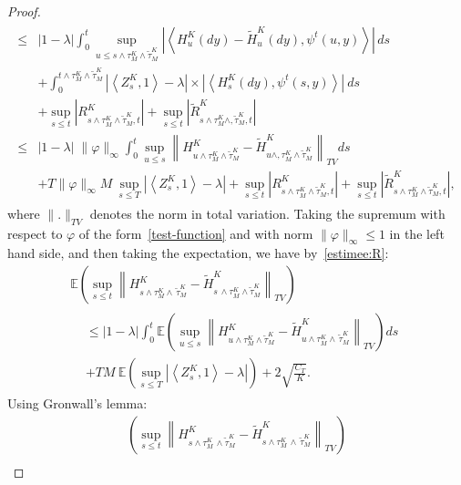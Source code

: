 \documentclass[AHL,Unicode,longabstracts,published]{cedram}
\newcommand*\E{\mathbb{E}}
\begin{document}
\begin{proof}
\begin{multline*}
\begin{aligned}
\leq & |1-\lambda| \int_0^t \sup_{u \leq s \wedge \tau^K_M \wedge \widetilde{\tau}^K_M} \left|\left\langle H^K_{u}(dy) - \widetilde{H}^K_{u}(dy),\psi^t(u,y)\right\rangle \right| \, ds \\
& + \int_0^{t \wedge \tau^K_M \wedge \widetilde{\tau}^K_M} \left|\left\langle Z^K_s,1\right\rangle- \lambda \right|\times \left|\left\langle H^K_s(dy),\psi^t(s,y)\right\rangle\right| \ ds\\
& + \sup_{s \leq t} \left| R_{s \wedge \tau^K_M \wedge \widetilde{\tau}^K_M, t}^{K} \right| + \sup_{s \leq t}\left|\widetilde{R}_{s \wedge \tau^K_M \wedge ,\widetilde{\tau}^K_M, t}^K\right|\\
\leq & |1-\lambda|\; \|\varphi\|_\infty \int_0^t \sup_{u \leq s} \left\| H^K_{u \wedge \tau^K_M \wedge\widetilde{\tau}^K_M} - \widetilde{H}^K_{u \wedge ,\tau^K_M \wedge \widetilde{\tau}^K_M}\right\|_{TV} ds \\
& + T\|\varphi\|_\infty M \ \sup_{s \leq T} \left|\left\langle Z^K_s,1\right\rangle- \lambda \right| + \sup_{s \leq t} \left| R_{s \wedge \tau^K_M \wedge  \widetilde{\tau}^K_M, t}^{K} \right| + \sup_{s \leq t}\left|\widetilde{R}_{s \wedge \tau^K_M \wedge  \widetilde{\tau}^K_M, t}^K\right|,
\end{aligned}
\end{multline*}
\endgroup
where $\|.\|_{TV}$ denotes the norm in total variation. Taking the supremum with respect to $\varphi$ of the form~\eqref{test-function} and with norm $\|\varphi\|_\infty\leq 1$ in the left hand side, and then taking the expectation, we have by~\eqref{estimee:R}:
\begingroup
\allowdisplaybreaks
\begin{multline*}
\E\left(\sup_{s \leq t} \left\|H^K_{s \wedge  \tau^K_M \wedge\,\widetilde{\tau}^K_M}-\widetilde{H}^K_{s\,\wedge \tau^K_M \wedge \widetilde{\tau}^K_M} \right\|_{TV}\right)\\
\begin{aligned}
&\leq |1-\lambda| \int_0^t \E\left(\sup_{u \leq s} \left\|H^K_{u \wedge \tau^K_M \wedge \widetilde{\tau}^K_M}- \widetilde{H}^K_{u \wedge \tau^K_M \wedge\,\widetilde{\tau}^K_M}\right\|_{TV} \right) ds \\
&+ TM \ \E\left(\sup_{s \leq T} \left|\left\langle Z^K_s,1\right\rangle- \lambda \right|\right)+ 2 \sqrt{\frac{C_T }{K}}.
\end{aligned}
\end{multline*}
\endgroup
Using Gronwall's lemma:
\begingroup
\allowdisplaybreaks
\begin{multline*}
\left(\sup_{s \leq t} \left\|H^K_{s \wedge \tau^K_M\,\wedge \widetilde{\tau}^K_M}-\widetilde{H}^K_{s \wedge \tau^K_M\,\wedge\,\widetilde{\tau}^K_M} \right\|_{TV}\right)\\

\end{multline*}
\end{proof}
\end{document}
